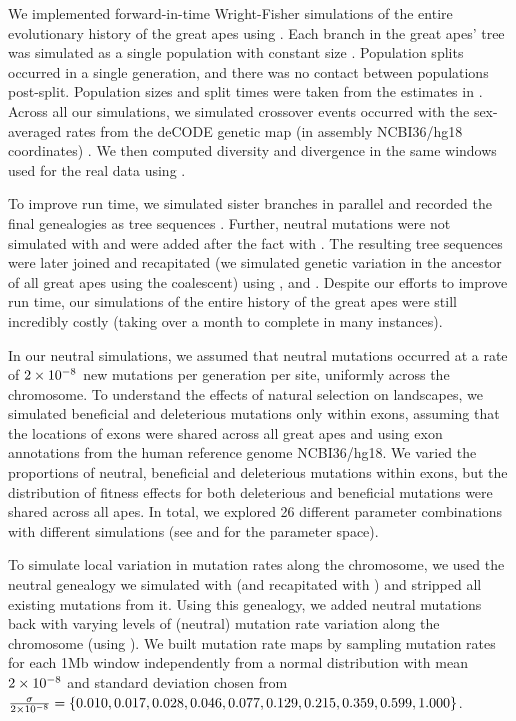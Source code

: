 We implemented forward-in-time Wright-Fisher simulations of the entire evolutionary history of the great apes using \slim \citep{haller_slim_2019, haller_tree-sequence_2019}.
Each branch in the great apes' tree was simulated as a single population with constant size .
Population splits occurred in a single generation, 
and there was no contact between populations post-split.
Population sizes and split times were taken from the estimates in \citet{prado-martinez_great_2013}.
Across all our simulations, we simulated crossover events occurred with the sex-averaged rates from the deCODE genetic map (in assembly NCBI36/hg18 coordinates) \citep{kong_high-resolution_2002}.
We then computed diversity and divergence in the same windows used for the real data using \tskit \citep{kelleher_efficient_2018, ralph_efficiently_2020}.

To improve run time, we simulated sister branches in parallel and recorded the final genealogies as tree sequences \citep{kelleher_efficient_2016}.
Further, neutral mutations were not simulated with \slim and were added after the fact with \msprime.
The resulting tree sequences were later joined and recapitated (\ie we simulated genetic variation in the ancestor of all great apes using the coalescent) using \msprime, \tskit and \pyslim \citep{kelleher_efficient_2016, kelleher_efficient_2018, rodrigues_vignette_2021}.
Despite our efforts to improve run time, our simulations of the entire history of the great apes were still incredibly costly (taking over a month to complete in many instances).

In our neutral simulations, we assumed that neutral mutations occurred at a rate of ${2}\times10^{-8}$ new mutations per generation per site, uniformly across the chromosome.
To understand the effects of natural selection on landscapes, we simulated beneficial and deleterious mutations only within exons,
assuming that the locations of exons were shared across all great apes \citep{kronenberg_high-resolution_2018} and using exon annotations from the human reference genome NCBI36/hg18.
We varied the proportions of neutral, beneficial and deleterious mutations within exons, 
but the distribution of fitness effects for both deleterious and beneficial mutations were shared across all apes.
In total, we explored 26 different parameter combinations with different simulations (see  and  for the parameter space).

To simulate local variation in mutation rates along the chromosome, 
we used the neutral genealogy we simulated with \slim (and recapitated with \msprime) and stripped all existing mutations from it.
Using this genealogy, we added neutral mutations back with varying levels of (neutral) mutation rate variation along the chromosome (using \msprime).
We built mutation rate maps by sampling mutation rates for each 1Mb window independently from a normal distribution with mean ${2}\times10^{-8}$
and standard deviation chosen from $\frac{\sigma}{{2}\times10^{-8}} = \{ 0.010, 0.017, 0.028, 0.046, 0.077, 0.129,\allowbreak 0.215, 0.359, 0.599, 1.000 \}$.


